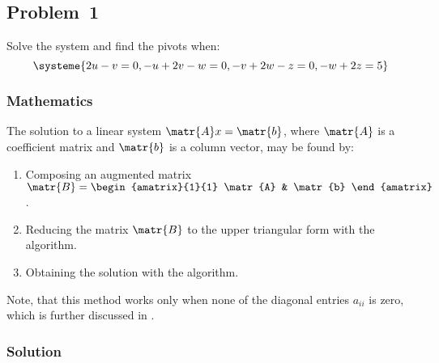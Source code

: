 \subsection{Problem~1}%
\label{problem:1}

Solve the system and find the pivots when:
\begin{equation*}
    \systeme{2u-v=0,-u+2v-w=0,-v+2w-z=0,-w+2z=5}
\end{equation*}

\subsubsection*{Mathematics}
The solution to a linear system $\matr{A}x = \matr{b}$, where $\matr{A}$ is a
coefficient matrix and $\matr{b}$ is a column vector, may be found by:
\begin{enumerate}
  \item Composing an augmented matrix
    $\matr{B} = \begin{amatrix}{1}{1}
      \matr{A} & \matr{b}
    \end{amatrix}$.
  \item Reducing the matrix $\matr{B}$ to the upper triangular form
    with the \textit{} algorithm.
  \item Obtaining the solution with the \textit{} algorithm.
\end{enumerate}

Note, that this method works only when none of the diagonal entries $a_{ii}$ is zero,
which is further discussed in .

\subsubsection*{Solution}

